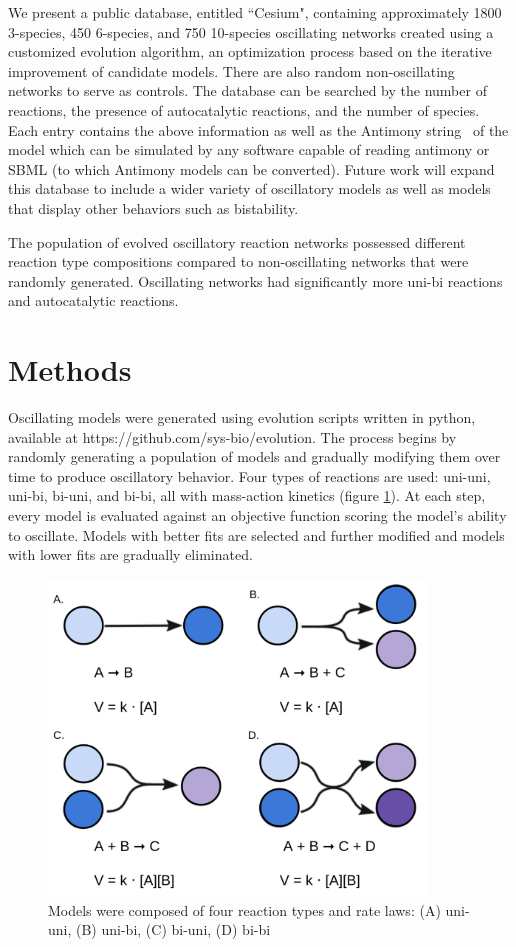 \documentclass[12pt]{report}
\begin{document}
We present a public database, entitled ``Cesium",  containing approximately 1800 3-species, 450 6-species, and 750 10-species oscillating networks created using a customized evolution algorithm, an optimization process based on the iterative improvement of candidate models. There are also random non-oscillating networks to serve as controls. The database can be searched by the number of reactions, the presence of autocatalytic reactions, and the number of species. Each entry contains the above information as well as the Antimony string~\cite{Smith2009} of the model which can be simulated by any software capable of reading antimony or SBML (to which Antimony models can be converted). Future work will expand this database to include a wider variety of oscillatory models as well as models that display other behaviors such as bistability. 

The population of evolved oscillatory reaction networks possessed different reaction type compositions compared to non-oscillating networks that were randomly generated. Oscillating networks had significantly more uni-bi reactions and autocatalytic reactions. 


\section{Methods}
Oscillating models were generated using evolution scripts written in python, available at https://github.com/sys-bio/evolution. The process begins by randomly generating a population of models and gradually modifying them over time to produce oscillatory behavior. Four types of reactions are used: uni-uni, uni-bi, bi-uni, and bi-bi, all with mass-action kinetics (figure \ref{fig:reaction}). At each step, every model is evaluated against an objective function scoring the model's ability to oscillate. Models with better fits are selected and further modified and models with lower fits are gradually eliminated. 
\begin{figure}
    \centering
    \includegraphics[width=10cm]{images/Reactions.png}
    \caption[Types of reactions and their rate laws]{Models were composed of four reaction types and rate laws: (A) uni-uni, (B) uni-bi, (C) bi-uni, (D) bi-bi}
    \label{fig:reaction}
    
\end{figure}
\end{document}
